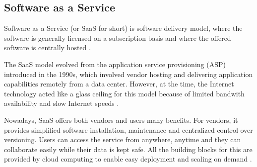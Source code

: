 
\subsection{Software as a Service}

Software as a Service (or SaaS for short) is software delivery model, where the software is generally licensed on a subscription basis and where the offered software is centrally hosted \cite{SaaSWikipedia}.

The SaaS model evolved from the application service provisioning (ASP) introduced in the 1990s, which involved vendor hosting and delivering application capabilities remotely from a data center. However, at the time, the Internet technology acted like a glass ceiling for this model because of limited bandwith availability and slow Internet speeds \cite{SaaSOppRisk}.

Nowadays, SaaS offers both vendors and users many benefits. For vendors, it provides simplified software installation, maintenance and centralized control over versioning. Users can access the service from anywhere, anytime and they can collaborate easily while their data is kept safe. All the building blocks for this are provided by cloud computing to enable easy deployment and scaling on demand \cite{AboveTheClouds}.

